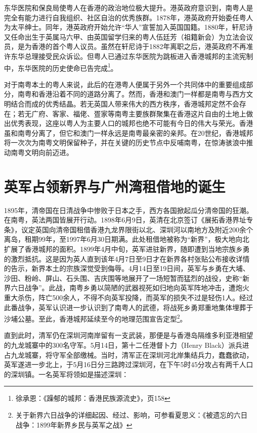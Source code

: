 东华医院和保良局使粤人在香港的政治地位极大提升。港英政府意识到，南粤人是完全有能力进行自我组织、社区自治的优秀族群。1878年，港英政府开始委任粤人为太平绅士。同年，港英政府开始允许“华人”宣誓加入英国国籍。1880年，轩尼诗又任命出生于英属马六甲、由英国留学归来的粤人伍廷芳（祖籍新会）为立法会议员，是为香港的首个粤人议员。虽然在轩尼诗于1882年离职之后，港英政府不再准许东华总理接受民众诉讼。但粤人已通过东华医院为跳板进入香港城邦的主流宪制中，东华医院的历史使命已告完成\footnote{徐承恩：《躁郁的城邦：香港民族源流史》，页158}。

对于南粤本土的粤人来说，此后的在港粤人便属于另外一个共同体中的重要组成部分，南粤和香港沿着不同的道路分离了。然而，香港和澳门一样都是南粤与西方文明结合而成的优秀结晶。若无英国人带来伟大的西方秩序，香港城邦定然不会存在；若无广府、客家、福佬、疍家等南粤主要族群聚集在香港这片自由的土地上做出优秀表现，这座以粤人为主要人口的城邦也绝不可能有今日的伟大与荣光。香港虽和南粤分离了，但它和澳门一样永远是南粤最亲密的亲邦。在20世纪，香港城邦将一次次为南粤文明保留种子，并在关键的历史节点中反哺南粤，在惊涛骇浪中推动南粤文明向前迈进。

\section{英军占领新界与广州湾租借地的诞生}

1895年，清帝国在日清战争中惨败于日本之手，西方各国掀起瓜分清帝国的狂潮。在南粤，英法两国皆展开行动。1898年6月9日，英清在北京签订《展拓香港界址专条》，议定英国向清帝国租借香港九龙界限街以北、深圳河以南地方及附近200余个离岛，租期99年，至1997年6月30日期满。此处租借地被称为“新界”，极大地向北扩展了香港城邦的面积。1899年4月中旬，英军进驻新界，随即遭到当地宗族乡勇的激烈抵抗。这是因为英人直到该年4月7日至9日才在新界各村张贴公布接收详情的告示，新界本土的宗族深觉受到侮辱。4月14日至19日间，英军与乡勇在大埔、沙田、粉岭、屏山、石头围、吉庆围等地展开了一场短暂而猛烈的战役，史称“新界六日战争”。此战，南粤乡勇以简陋的武器视死如归地向英军阵地冲击，遭炮火重大杀伤，阵亡500余人，不得不向英军投降，而英军的损失不过是轻伤1人。经过此番战争，英军认识进一步认识到了南粤人的武德，将战死乡勇郑重地集体埋葬于沙埔公墓。至此，香港城邦延续至今的地理范围宣告定型\footnote{关于新界六日战争的详细起因、经过、影响，可参看夏思义：《被遗忘的六日战争：1899年新界乡民与英军之战》}。

直到此时，清军仍在深圳河南岸留有一支武装，那便是与香港岛隔维多利亚港相望的九龙城寨中的300名守军。5月14日，第十二任港督卜力（Henry Black）派兵进占九龙城寨，将守军全部缴械。当时，清军正在深圳河北岸集结兵力，蠢蠢欲动，英军遂进一步北上，于5月16日分三路跨过深圳河，在下午5时45分攻占有两千人口的深圳镇。一名英军将领如是描述深圳：

